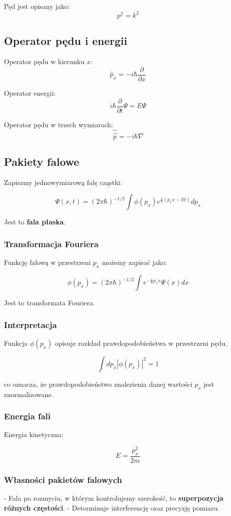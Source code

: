 Pęd jest opisany jako:
\[
p^2 = k^2
\]

\subsection{Operator pędu i energii}
Operator pędu w kierunku $x$:
\[
\hat{p}_x = -i\hbar \frac{\partial}{\partial x}
\]

Operator energii:
\[
i\hbar \frac{\partial}{\partial t} \Psi = E \Psi
\]

Operator pędu w trzech wymiarach:
\[
\hat{\vec{p}} = -i\hbar \nabla
\]

\subsection{Pakiety falowe}
Zapiszmy jednowymiarową falę cząstki:

\[
\Psi(x,t) = (2\pi\hbar)^{-1/2} \int \phi(p_x) e^{\frac{i}{\hbar} (p_x x - E t)} dp_x
\]

Jest to \textbf{fala płaska}.

\subsubsection{Transformacja Fouriera}
Funkcję falową w przestrzeni $p_x$ możemy zapisać jako:

\[
\phi(p_x) = (2\pi\hbar)^{-1/2} \int e^{-\frac{i}{\hbar} p_x x} \Psi(x) dx
\]

Jest to transformata Fouriera.

\subsubsection{Interpretacja}
Funkcja $\phi(p_x)$ opisuje rozkład prawdopodobieństwa w przestrzeni pędu.

\[
\int dp_x |\phi(p_x)|^2 = 1
\]

co oznacza, że prawdopodobieństwo znalezienia danej wartości $p_x$ jest znormalizowane.

\subsubsection{Energia fali}
Energia kinetyczna:

\[
E = \frac{p_x^2}{2m}
\]

\subsubsection{Własności pakietów falowych}
- Fala po rozmyciu, w którym kontrolujemy szerokość, to \textbf{superpozycja różnych częstości}.
- Determinuje interferencję oraz precyzję pomiaru.

